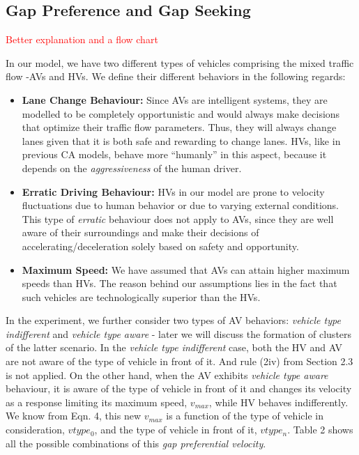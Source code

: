 \documentclass[oneside,letter,11pt]{article}
\begin{document}
\subsection{\textbf{Gap Preference and Gap Seeking}}

\textcolor{red}{Better explanation and a flow chart\\}

In our model, we have two different types of vehicles comprising the mixed traffic flow -AVs and HVs. We define their different behaviors in the following regards:

\begin{itemize}
    \item \textbf{Lane Change Behaviour:} Since AVs are intelligent systems, they are modelled to be completely opportunistic and would always make decisions that optimize their traffic flow parameters. Thus, they will always change lanes given that it is both safe and rewarding to change lanes. HVs, like in previous CA models, behave more ``humanly'' in this aspect, because it depends on the \textit{aggressiveness} of the human driver. 
    \item \textbf{Erratic Driving Behaviour:} HVs in our model are prone to velocity fluctuations due to human behavior or due to varying external conditions. This type of \textit{erratic} behaviour does not apply to AVs, since they are well aware of their surroundings and make their decisions of accelerating/deceleration solely based on safety and opportunity. 
    \item \textbf{Maximum Speed:} We have assumed that AVs can attain higher maximum speeds than HVs. The reason behind our assumptions lies in the fact that such vehicles are technologically superior than the HVs. 
\end{itemize}


In the experiment, we further consider two types of AV behaviors: \textit{vehicle type indifferent} and \textit{vehicle type aware} - later we will discuss the formation of clusters of the latter scenario. In the \textit{vehicle type indifferent} case, both the HV and AV are not aware of the type of vehicle in front of it. And rule (2iv) from Section 2.3 is not applied. On the other hand, when the AV exhibits \textit{vehicle type aware} behaviour, it is aware of the type of vehicle in front of it and changes its velocity as a response limiting its maximum speed, $v_{max}$, while HV behaves indifferently. We know from Eqn. 4, this new $v_{max}$ is a function of the type of vehicle in consideration, $vtype_0$, and the type of vehicle in front of it, $vtype_n$. Table 2 shows all the possible combinations of this \textit{gap preferential velocity}.
\end{document}
